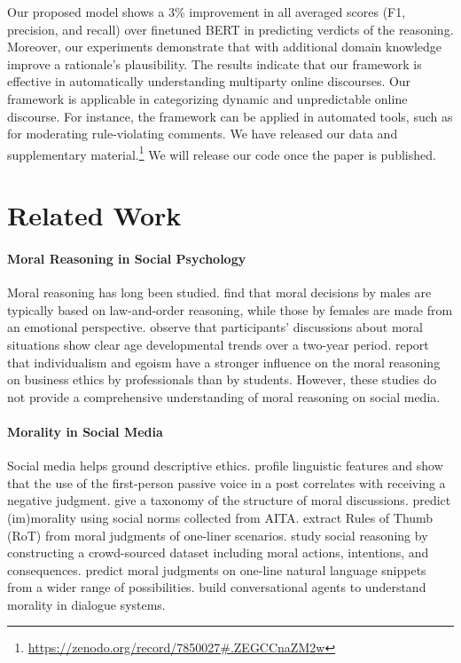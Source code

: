 \documentclass[letterpaper]{article} %
\begin{document}
Our proposed model shows a 3\% improvement in all averaged scores (F1, precision, and recall) over finetuned BERT in predicting verdicts of the reasoning.
Moreover, our experiments demonstrate that with additional domain knowledge improve a rationale's plausibility.
The results indicate that our framework is effective in automatically understanding multiparty online discourses. 
Our framework is applicable in categorizing dynamic and unpredictable online discourse.
For instance, the framework can be applied in automated tools, such as for moderating rule-violating comments.
We have released our data and supplementary material.\footnote{\url{https://zenodo.org/record/7850027#.ZEGCCnaZM2w}} 
We will release our code once the paper is published.

\section{Related Work}

\paragraph{Moral Reasoning in Social Psychology}

Moral reasoning has long been studied.
\citet{bussey-1982-gender} find that moral decisions by males are typically based on law-and-order reasoning, while those by females are made from an emotional perspective. 
\citet{lawrence-1989-long} observe that participants' discussions about moral situations show clear age developmental trends over a two-year period.
\citet{wood-1988-ethical} report that individualism and egoism have a stronger influence on the moral reasoning on business ethics by professionals than by students. 
However, these studies do not provide a comprehensive understanding of moral reasoning on social media.

\paragraph{Morality in Social Media}

Social media helps ground descriptive ethics.
\citet{zhou-2021-assessing} profile linguistic features and show that the use of the first-person passive voice in a post correlates with receiving a negative judgment.
\citet{nguyen-2022-mapping} give a taxonomy of the structure of moral discussions.
\citet{lourie-2020-scruples} predict (im)morality using social norms collected from AITA.
\citet{forbes-2020-social} extract Rules of Thumb (RoT) from moral judgments of one-liner scenarios.
\citet{emelin-2020-moralstories} study social reasoning by constructing a crowd-sourced dataset including moral actions, intentions, and consequences.
\citet{jiang-2021-delphi} predict moral judgments on one-line natural language snippets from a wider range of possibilities.
\citet{ziems-2022-moral} build conversational agents to understand morality in dialogue systems.
\end{document}
